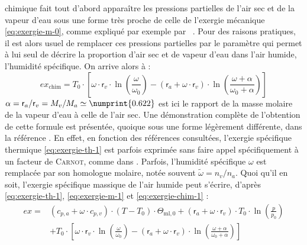 \documentclass[a4paper,11pt]{scrartcl}
\begin{document}
chimique fait tout d'abord apparaître les pressions partielles de l'air sec et
de la vapeur d'eau sous une forme très proche de celle de l'exergie mécanique
\eqref{eq:exergie-m-0}, comme expliqué par exemple par
\citeauthor{TI-BE8015}~\cite{TI-BE8015}. Pour des raisons pratiques, il est
alors usuel de remplacer ces pressions partielles par le paramètre qui permet à
lui seul de décrire la proportion d'air sec et de vapeur d'eau dans l'air
humide, l'humidité spécifique. On arrive alors à : \begin{equation}
	ex_{\text{chim}} = T_0 \cdot \left[ \omega \cdot \mathsf{r}_v \cdot
	\ln\left( \frac{\omega}{\omega_0} \right) - (\mathsf{r}_a + \omega \cdot
	\mathsf{r}_v) \cdot \ln\left( \frac{\omega+\alpha}{\omega_0+\alpha}
	\right) \right] \label{eq:exergie-chim-1}
\end{equation} $\alpha = \mathsf{r}_a/\mathsf{r}_v = M_v/M_a \simeq
\numprint{0.622}$ est ici le rapport de la masse molaire de la vapeur d'eau à
celle de l'air sec. Une démonstration complète de l'obtention de cette formule
est présentée, quoique sous une forme légèrement différente, dans la référence
\cite[page 213]{Bejan-2006}. En effet, en fonction des références consultées,
l'exergie spécifique thermique \eqref{eq:exergie-th-1} est parfois exprimée sans
faire appel spécifiquement à un facteur de \textsc{Carnot}, comme dans
\cite{ASHRAE-1979,Bejan-2006}. Parfois, l'humidité spécifique $\omega$ est
remplacée par son homologue molaire, notée souvent $\tilde{\omega} = n_v/n_a$.
Quoi qu'il en soit, l'exergie spécifique massique de l'air humide peut s'écrire,
d'après \eqref{eq:exergie-th-1}, \eqref{eq:exergie-m-1} et
\eqref{eq:exergie-chim-1} : \begin{equation}
	\begin{split}
		ex = & \left( c_{p,a} + \omega \cdot c_{p,v} \right) \cdot
		(T-T_0) \cdot \Theta_{\text{ml},0} + (\mathsf{r}_a + \omega
		\cdot \mathsf{r}_v) \cdot T_0 \cdot \ln\left( \frac{p}{p_0}
		\right) \\
		& + T_0 \cdot \left[ \omega \cdot \mathsf{r}_v \cdot \ln\left(
		\frac{\omega}{\omega_0} \right) - (\mathsf{r}_a + \omega \cdot
		\mathsf{r}_v) \cdot \ln\left(
		\frac{\omega+\alpha}{\omega_0+\alpha} \right) \right]
	\end{split}
\end{equation} 

\end{document}
